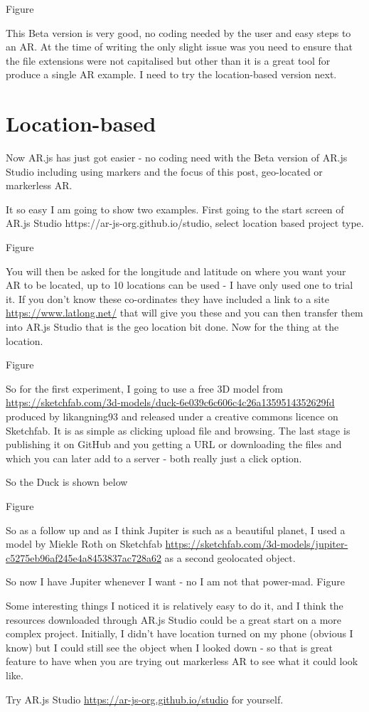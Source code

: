 Figure 

This Beta version is very good, no coding needed by the user and easy steps to an AR.  At the time of writing the only slight issue was you need to ensure that the file extensions were not capitalised but other than it is a great tool for produce a single AR example. I need to try the location-based version next.



\section{Location-based}
 Now AR.js has just got easier - no coding need with the Beta version of AR.js Studio  including using markers and the focus of this post, geo-located or markerless AR.
 
 It so easy I am going to show two examples. First going to the start screen of AR.js Studio https://ar-js-org.github.io/studio, select location based project type.
 
 Figure
 
 You will then be asked for the longitude and latitude on where you want your AR to be located, up to 10 locations can be used - I have only used one to trial it. If you don't know these co-ordinates they have included a link to a site \url{https://www.latlong.net/}  that will give you these and you can then transfer them into AR.js Studio that is the geo location bit done. Now for the thing at the location.
 
 Figure
 
So for the first experiment, I going to use a free 3D model from \url{https://sketchfab.com/3d-models/duck-6e039c6c606c4c26a1359514352629fd}  produced by likangning93 and released under a creative commons licence on Sketchfab. It is as simple as clicking upload file and browsing. The last stage is publishing it on GitHub and you getting a URL or downloading the files and which you can later add to a server - both really just a click option. 

So the Duck is shown below 

Figure

So as a follow up and as I think Jupiter is such as a beautiful planet, I used a model by Miekle Roth on Sketchfab \url{https://sketchfab.com/3d-models/jupiter-c5275eb96af245e4a8453837ac728a62}  as a second geolocated object. 

So now I have Jupiter whenever I want - no I am not that power-mad.
 Figure
 
 Some interesting things I noticed it is relatively easy to do it, and I think the resources downloaded through AR.js Studio could be a great start on a more complex project. Initially, I didn't have location turned on my phone (obvious I know) but I could still see the object when I looked down - so that is great feature to have when you are trying out markerless AR to see what it could look like. 

Try AR.js Studio \url{https://ar-js-org.github.io/studio} for yourself.
